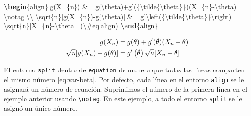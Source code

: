 \documentclass[12pt,]{krantz}
\makeatletter
\newenvironment{Shaded}{\begin{snugshade}}{\end{snugshade}}
\newcommand{\KeywordTok}[1]{\textcolor[rgb]{0.13,0.29,0.53}{\textbf{#1}}}
\newcommand{\SpecialCharTok}[1]{\textcolor[rgb]{0.00,0.00,0.00}{#1}}
\newcommand{\SpecialStringTok}[1]{\textcolor[rgb]{0.31,0.60,0.02}{#1}}
\newcommand{\ExtensionTok}[1]{#1}
\newcommand{\NormalTok}[1]{#1}
\newenvironment{kframe}{%
\medskip{}
\setlength{\fboxsep}{.8em}
 \def\at@end@of@kframe{}%
 \ifinner\ifhmode%
  \def\at@end@of@kframe{\end{minipage}}%
  \begin{minipage}{\columnwidth}%
 \fi\fi%
 \def\FrameCommand##1{\hskip\@totalleftmargin \hskip-\fboxsep
 \colorbox{shadecolor}{##1}\hskip-\fboxsep
     \hskip-\linewidth \hskip-\@totalleftmargin \hskip\columnwidth}%
 \MakeFramed {\advance\hsize-\width
   \@totalleftmargin\z@ \linewidth\hsize
   \@setminipage}}%
 {\par\unskip\endMakeFramed%
 \at@end@of@kframe}
\renewenvironment{Shaded}{\begin{kframe}}{\end{kframe}}
\theoremstyle{definition}
\theoremstyle{definition}
\theoremstyle{definition}
\theoremstyle{remark}
\makeatother
\begin{document}
\begin{Shaded}
\begin{Highlighting}[]
\KeywordTok{\textbackslash{}begin}\NormalTok{\{}\ExtensionTok{align}\NormalTok{\}}\SpecialStringTok{ }
\SpecialStringTok{g(X_\{n\}) &= g(}\SpecialCharTok{\textbackslash{}theta}\SpecialStringTok{)+g'(\{}\SpecialCharTok{\textbackslash{}tilde}\SpecialStringTok{\{}\SpecialCharTok{\textbackslash{}theta}\SpecialStringTok{\}\})(X_\{n\}-}\SpecialCharTok{\textbackslash{}theta}\SpecialStringTok{) }\SpecialCharTok{\textbackslash{}notag}\SpecialStringTok{ }\SpecialCharTok{\textbackslash{}\textbackslash{}}
\SpecialCharTok{\textbackslash{}sqrt}\SpecialStringTok{\{n\}[g(X_\{n\})-g(}\SpecialCharTok{\textbackslash{}theta}\SpecialStringTok{)] &= g'}\SpecialCharTok{\textbackslash{}left}\SpecialStringTok{(\{}\SpecialCharTok{\textbackslash{}tilde}\SpecialStringTok{\{}\SpecialCharTok{\textbackslash{}theta}\SpecialStringTok{\}\}}\SpecialCharTok{\textbackslash{}right}\SpecialStringTok{)}
\SpecialStringTok{  }\SpecialCharTok{\textbackslash{}sqrt}\SpecialStringTok{\{n\}[X_\{n\}-}\SpecialCharTok{\textbackslash{}theta}\SpecialStringTok{ ] (}\SpecialCharTok{\textbackslash{}#}\SpecialStringTok{eq:align)}
\KeywordTok{\textbackslash{}end}\NormalTok{\{}\ExtensionTok{align}\NormalTok{\} }
\end{Highlighting}
\end{Shaded}

\begin{align}
g(X_{n}) &= g(\theta)+g'({\tilde{\theta}})(X_{n}-\theta) \notag \\
\sqrt{n}[g(X_{n})-g(\theta)] &= g'\left({\tilde{\theta}}\right)
  \sqrt{n}[X_{n}-\theta ] \label{eq:align}
\end{align}

El entorno \texttt{split} dentro de \texttt{equation} de manera que
todas las líneas comparten el mismo número \eqref{eq:var-beta}. Por
defecto, cada línea en el entorno \texttt{align} se le asignará un
número de ecuación. Suprimimos el número de la primera línea en el
ejemplo anterior usando \texttt{\textbackslash{}notag}. En este ejemplo,
a todo el entorno \texttt{split} se le asignó un único número.
\end{document}
